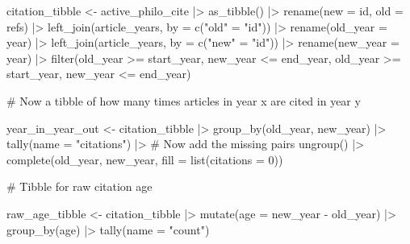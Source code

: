 \documentclass[
  10pt,
  letterpaper,
  DIV=11,
  numbers=noendperiod,
  twoside]{scrartcl}
\newenvironment{Shaded}{\begin{snugshade}}{\end{snugshade}}
\newcommand{\AttributeTok}[1]{\textcolor[rgb]{0.40,0.45,0.13}{#1}}
\newcommand{\CommentTok}[1]{\textcolor[rgb]{0.37,0.37,0.37}{#1}}
\newcommand{\DecValTok}[1]{\textcolor[rgb]{0.68,0.00,0.00}{#1}}
\newcommand{\FunctionTok}[1]{\textcolor[rgb]{0.28,0.35,0.67}{#1}}
\newcommand{\NormalTok}[1]{\textcolor[rgb]{0.00,0.23,0.31}{#1}}
\newcommand{\OtherTok}[1]{\textcolor[rgb]{0.00,0.23,0.31}{#1}}
\newcommand{\SpecialCharTok}[1]{\textcolor[rgb]{0.37,0.37,0.37}{#1}}
\newcommand{\StringTok}[1]{\textcolor[rgb]{0.13,0.47,0.30}{#1}}
\begin{document}
\begin{Shaded}
\begin{Highlighting}[]
\NormalTok{citation\_tibble }\OtherTok{\textless{}{-}}\NormalTok{ active\_philo\_cite }\SpecialCharTok{|\textgreater{}}
  \FunctionTok{as\_tibble}\NormalTok{() }\SpecialCharTok{|\textgreater{}}
  \FunctionTok{rename}\NormalTok{(}\AttributeTok{new =}\NormalTok{ id, }\AttributeTok{old =}\NormalTok{ refs) }\SpecialCharTok{|\textgreater{}}
  \FunctionTok{left\_join}\NormalTok{(article\_years, }\AttributeTok{by =} \FunctionTok{c}\NormalTok{(}\StringTok{"old"} \OtherTok{=} \StringTok{"id"}\NormalTok{)) }\SpecialCharTok{|\textgreater{}}
  \FunctionTok{rename}\NormalTok{(}\AttributeTok{old\_year =}\NormalTok{ year)  }\SpecialCharTok{|\textgreater{}}
  \FunctionTok{left\_join}\NormalTok{(article\_years, }\AttributeTok{by =} \FunctionTok{c}\NormalTok{(}\StringTok{"new"} \OtherTok{=} \StringTok{"id"}\NormalTok{)) }\SpecialCharTok{|\textgreater{}}
  \FunctionTok{rename}\NormalTok{(}\AttributeTok{new\_year =}\NormalTok{ year) }\SpecialCharTok{|\textgreater{}}
  \FunctionTok{filter}\NormalTok{(old\_year }\SpecialCharTok{\textgreater{}=}\NormalTok{ start\_year,}
\NormalTok{         new\_year }\SpecialCharTok{\textless{}=}\NormalTok{ end\_year,}
\NormalTok{         old\_year }\SpecialCharTok{\textgreater{}=}\NormalTok{ start\_year,}
\NormalTok{         new\_year }\SpecialCharTok{\textless{}=}\NormalTok{ end\_year)}

\CommentTok{\# Now a tibble of how many times articles in year x are cited in year y}

\NormalTok{year\_in\_year\_out }\OtherTok{\textless{}{-}}\NormalTok{ citation\_tibble }\SpecialCharTok{|\textgreater{}}
  \FunctionTok{group\_by}\NormalTok{(old\_year, new\_year) }\SpecialCharTok{|\textgreater{}}
  \FunctionTok{tally}\NormalTok{(}\AttributeTok{name =} \StringTok{"citations"}\NormalTok{) }\SpecialCharTok{|\textgreater{}} \CommentTok{\# Now add the \textquotesingle{}missing\textquotesingle{} pairs}
  \FunctionTok{ungroup}\NormalTok{() }\SpecialCharTok{|\textgreater{}}
  \FunctionTok{complete}\NormalTok{(old\_year, new\_year, }\AttributeTok{fill =} \FunctionTok{list}\NormalTok{(}\AttributeTok{citations =} \DecValTok{0}\NormalTok{))}

\CommentTok{\# Tibble for raw citation age}

\NormalTok{raw\_age\_tibble }\OtherTok{\textless{}{-}}\NormalTok{ citation\_tibble }\SpecialCharTok{|\textgreater{}}
  \FunctionTok{mutate}\NormalTok{(}\AttributeTok{age =}\NormalTok{ new\_year }\SpecialCharTok{{-}}\NormalTok{ old\_year) }\SpecialCharTok{|\textgreater{}}
  \FunctionTok{group\_by}\NormalTok{(age) }\SpecialCharTok{|\textgreater{}}
  \FunctionTok{tally}\NormalTok{(}\AttributeTok{name =} \StringTok{"count"}\NormalTok{)}


\end{Highlighting}
\end{Shaded}
\end{document}
